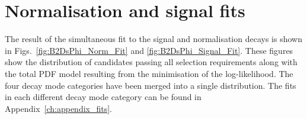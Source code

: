 





\section{Normalisation and signal fits}

The result of the simultaneous fit to the signal and normalisation decays is shown in Figs.~\ref{fig:B2DsPhi_Norm_Fit} and \ref{fig:B2DsPhi_Signal_Fit}. These figures show the distribution of candidates passing all selection requirements along with the total PDF model resulting from the minimisation of the log-likelihood. The four \Dsp decay mode categories have been merged into a single distribution. The fits in each different \Ds decay mode category can be found in Appendix~\ref{ch:appendix_fits}.



